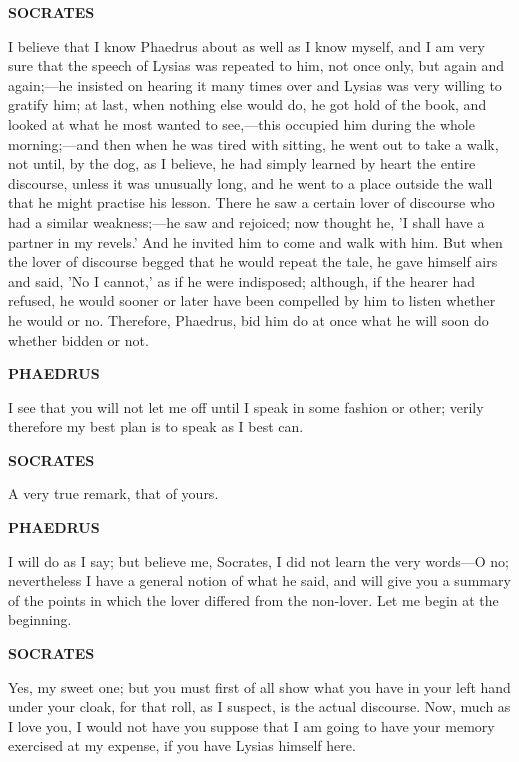 \documentclass[11pt,letter]{article}
\begin{document}
\par \textbf{SOCRATES}
\par   I believe that I know Phaedrus about as well as I know myself, and I am very sure that the speech of Lysias was repeated to him, not once only, but again and again;—he insisted on hearing it many times over and Lysias was very willing to gratify him; at last, when nothing else would do, he got hold of the book, and looked at what he most wanted to see,—this occupied him during the whole morning;—and then when he was tired with sitting, he went out to take a walk, not until, by the dog, as I believe, he had simply learned by heart the entire discourse, unless it was unusually long, and he went to a place outside the wall that he might practise his lesson. There he saw a certain lover of discourse who had a similar weakness;—he saw and rejoiced; now thought he, 'I shall have a partner in my revels.' And he invited him to come and walk with him. But when the lover of discourse begged that he would repeat the tale, he gave himself airs and said, 'No I cannot,' as if he were indisposed; although, if the hearer had refused, he would sooner or later have been compelled by him to listen whether he would or no. Therefore, Phaedrus, bid him do at once what he will soon do whether bidden or not.

\par \textbf{PHAEDRUS}
\par   I see that you will not let me off until I speak in some fashion or other; verily therefore my best plan is to speak as I best can.

\par \textbf{SOCRATES}
\par   A very true remark, that of yours.

\par \textbf{PHAEDRUS}
\par   I will do as I say; but believe me, Socrates, I did not learn the very words—O no; nevertheless I have a general notion of what he said, and will give you a summary of the points in which the lover differed from the non-lover. Let me begin at the beginning.

\par \textbf{SOCRATES}
\par   Yes, my sweet one; but you must first of all show what you have in your left hand under your cloak, for that roll, as I suspect, is the actual discourse. Now, much as I love you, I would not have you suppose that I am going to have your memory exercised at my expense, if you have Lysias himself here.
\end{document}
